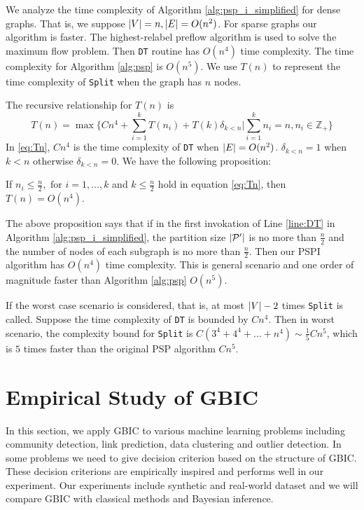 We analyze the time complexity of Algorithm \ref{alg:psp_i_simplified} for dense graphs. That is, we suppose $\lvert V\rvert = n, \lvert E\rvert = O(n^2)$. For sparse graphs our algorithm is faster. The highest-relabel preflow algorithm is used to solve the maximum flow problem. Then \texttt{DT} routine has $O(n^4)$ time complexity. The time complexity for Algorithm \ref{alg:psp} is $O(n^5)$.
We use $T(n)$ to represent the time complexity of \texttt{Split} when the graph has $n$ nodes.

The recursive relationship for $T(n)$ is
\begin{equation}\label{eq:Tn}
T(n) = \max \{ C n^4 + \sum_{i=1}^k T(n_i) + T(k)\delta_{k<n} | \sum_{i=1}^k n_i = n, n_i \in \mathbb{Z}_{+} \}
\end{equation}	
In \eqref{eq:Tn}, $Cn^4$ is the time complexity of \texttt{DT} when $\lvert E\rvert = O(n^2)$. $\delta_{k<n} = 1$ when $k<n$ otherwise $\delta_{k<n}=0$. We have the following proposition:
\begin{proposition}\label{prop:alg_complexity}
	 If $n_i \leq \frac{n}{2}, \textrm{ for } i=1,\dots,k$ and $ k \leq \frac{n}{2}$  hold in equation \eqref{eq:Tn}, then $T(n) = O(n^4)$.
\end{proposition}

The above proposition says that if in the first invokation of Line \ref{line:DT} in Algorithm \ref{alg:psp_i_simplified}, the partition size $\lvert\mathcal{P}'\rvert$ is no more than $\frac{n}{2}$ and the number of nodes of each subgraph is no more than $\frac{n}{2}$. Then our PSPI algorithm has $O(n^4)$ time complexity. This is general scenario and one order of magnitude faster than Algorithm \ref{alg:psp} $O(n^5)$.

If the worst case scenario is considered, that is, at most $\lvert V\rvert-2$ times \texttt{Split} is called. Suppose the time complexity of \texttt{DT} is bounded by $Cn^4$. Then in worst scenario, the complexity bound for \texttt{Split} is $C(3^4+4^4 + \dots + n^4) \sim \frac{1}{5}Cn^5$, which is $5$ times faster than the original PSP algorithm $Cn^5$.

\section{Empirical Study of GBIC}\label{sec:es}
In this section, we apply GBIC to various machine learning problems including community detection, link prediction, data clustering and outlier detection. In some problems we need to give decision criterion  based on the structure of GBIC. These decision criterions are empirically inspired and performs well in our experiment.  Our experiments
include synthetic and real-world dataset and we will compare GBIC with classical methods and Bayesian inference.
